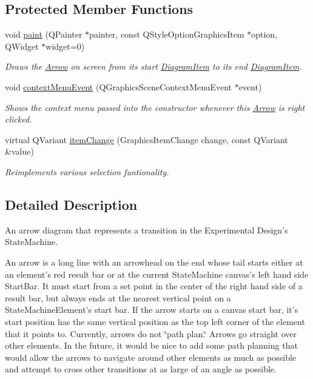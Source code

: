 \subsection*{Protected Member Functions}
\begin{DoxyCompactItemize}
\item 
void \hyperlink{class_arrow_ad6c7cb142beb5b655c95f4da437e2013}{paint} (Q\-Painter $\ast$painter, const Q\-Style\-Option\-Graphics\-Item $\ast$option, Q\-Widget $\ast$widget=0)
\begin{DoxyCompactList}\small\item\em Draws the \hyperlink{class_arrow}{Arrow} on screen from its start \hyperlink{class_diagram_item}{Diagram\-Item} to its end \hyperlink{class_diagram_item}{Diagram\-Item}. \end{DoxyCompactList}\item 
\hypertarget{class_arrow_a97a599b254cc8cecd86b2955b1d37a00}{void \hyperlink{class_arrow_a97a599b254cc8cecd86b2955b1d37a00}{context\-Menu\-Event} (Q\-Graphics\-Scene\-Context\-Menu\-Event $\ast$event)}\label{class_arrow_a97a599b254cc8cecd86b2955b1d37a00}

\begin{DoxyCompactList}\small\item\em Shows the context menu passed into the constructor whenever this \hyperlink{class_arrow}{Arrow} is right clicked. \end{DoxyCompactList}\item 
virtual Q\-Variant \hyperlink{class_arrow_a6d9409982fc2ff7f44676c319c3016f2}{item\-Change} (Graphics\-Item\-Change change, const Q\-Variant \&value)
\begin{DoxyCompactList}\small\item\em Reimplements various selection funtionality. \end{DoxyCompactList}\end{DoxyCompactItemize}


\subsection{Detailed Description}
An arrow diagram that represents a transition in the Experimental Design's State\-Machine. 

An arrow is a long line with an arrowhead on the end whose tail starts either at an element's red result bar or at the current State\-Machine canvas's left hand side Start\-Bar. It must start from a set point in the center of the right hand side of a result bar, but always ends at the nearest vertical point on a State\-Machine\-Element's start bar. If the arrow starts on a canvas start bar, it's start position has the same vertical position as the top left corner of the element that it points to. Currently, arrows do not \char`\"{}path plan.\char`\"{} Arrows go straight over other elements. In the future, it would be nice to add some path planning that would allow the arrows to navigate around other elements as much as possible and attempt to cross other transitions at as large of an angle as possible.

